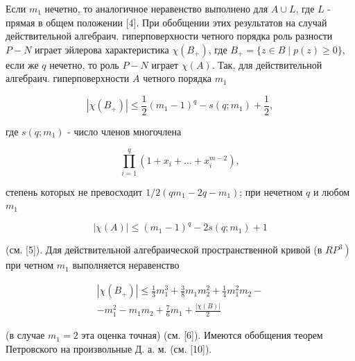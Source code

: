 \documentclass[10pt]{article}
\begin{document}
Если $m_{1}$ нечетно, то аналогичное неравенство выполнено для $A \cup L$, где $L$ - прямая в общем положении [4]. При обобщении этих результатов на случай действительной алгебраич. гиперповерхности четного порядка роль разности $P-N$ играет эйлерова характеристика $\chi\left(B_{+}\right)$, где $B_{+}=\{z \in B \mid p(z) \geqslant 0\}$, если же $q$ нечетно, то роль $P-N$ играет $\chi(A)$. Так, для действительной алгебраич. гиперповерхности $A$ четного порядка $m_{1}$



\[

\left|\chi\left(B_{+}\right)\right| \leqslant \frac{1}{2}\left(m_{1}-1\right)^{q}-s\left(q ; m_{1}\right)+\frac{1}{2},

\]



где $s\left(q ; m_{1}\right)$ - число членов многочлена



\[

\prod_{i=1}^{q}\left(1+x_{i}+\ldots+x_{i}^{m-2}\right),

\]



степень которых не превосходит $1 / 2\left(q m_{1}-2 q-m_{1}\right)$; при нечетном $q$ и любом $m_{1}$



\[

|\chi(A)| \leqslant\left(m_{1}-1\right)^{q}-2 s\left(q ; m_{1}\right)+1

\]



(см. [5]). Для действительной алгебраической пространственной кривой (в $\left.R P^{3}\right)$ при четном $m_{1}$ выполняется неравенство



\[

\begin{gathered}

\left|\chi\left(B_{+}\right)\right| \leqslant \frac{1}{3} m_{1}^{3}+\frac{3}{8} m_{1} m_{2}^{2}+\frac{1}{4} m_{1}^{2} m_{2}- \\

-m_{1}^{2}-m_{1} m_{2}+\frac{7}{6} m_{1}+\frac{|\chi(B)|}{2}

\end{gathered}

\]



(в случае $m_{1}=2$ эта оценка точная) (см. [6]). Имеются обобщения теорем Петровского на произвольные Д. а. м. (см. [10]).
\end{document}
